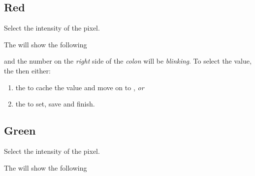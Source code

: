 \subsection{Red} 

Select the intensity of the  pixel.

\par\medskip

The  will show the following

\begin{figure}[H]
\centering
\end{figure}

and the number on the \textit{right} side of the \textit{colon} will be
\textit{blinking}.  To select the  value,  the  then
either:

\begin{enumerate}
  \item {} the  to cache the value and move on to ,
    \textit{or}
  \item {} the  to set, save and finish.
\end{enumerate}


\subsection{Green} 

Select the intensity of the  pixel.

\par\medskip

The  will show the following

\begin{figure}[H]
\centering
\end{figure}

